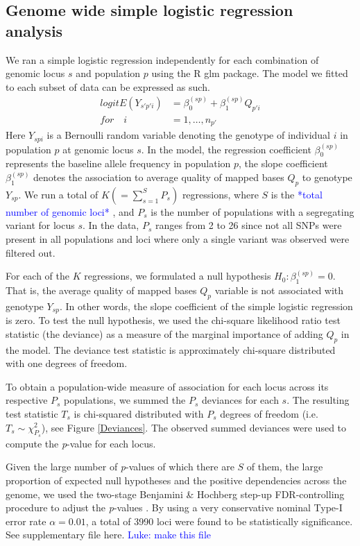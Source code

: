 \documentclass[9pt,lineno]{elife}
\newcommand{\luke}[1]{\textcolor{blue}{Luke: #1}}
\newcommand{\todo}[1]{\textcolor{blue}{*#1*}}
\begin{document}
\subsection{Genome wide simple logistic regression analysis}
We ran a simple logistic regression independently for each combination of genomic locus $s$ and population $p$ using the R glm package\citep{RDevelopmentCoreTeam2016}. The model we fitted to each subset of data can be expressed as such.
\begin{align*}
{logit}{E(Y_{s'p'i})} &= \beta_{0}^{(sp)} + \beta_{1}^{(sp)} Q_{p'i}
\\
\textit{for}\quad i &= 1,\hdots, n_{p'}
\end{align*}
Here $Y_{spi}$ is a Bernoulli random variable denoting the genotype of individual $i$ in population $p$ at genomic locus $s$. 
In the model, the regression coefficient $\beta_{0}^{(sp)}$ represents the baseline allele frequency in population $p$, the slope coefficient $\beta_{1}^{(sp)}$ denotes the association to average quality of mapped bases $Q_{p}$ to genotype $Y_{sp}$. 
We run a total of $K (= \sum_{s=1}^S P_s)$ regressions, where $S$ is the \todo{total number of genomic loci} , and $P_s$ is the number of populations with a segregating variant for locus $s$. In the data, $P_s$ ranges from 2 to 26 since not all SNPs were present in all populations and loci where only a single variant was observed were filtered out.

For each of the $K$ regressions, we formulated a null hypothesis $H_{0}: \beta_{1}^{(sp)}=0$. That is, the average quality of mapped bases $Q_{p}$ variable is not associated with genotype $Y_{sp}$.
In other words, the slope coefficient of the simple logistic regression is zero.
To test the null hypothesis, we used the chi-square likelihood ratio test statistic (the deviance) as a measure of the marginal importance of adding $Q_{p}$ in the model. 
The deviance test statistic is approximately chi-square distributed with one degrees of freedom.  

To obtain a population-wide measure of association for each locus across its respective $P_s$ populations, we summed the $P_s$ deviances for each $s$. The resulting test statistic $T_s$ is chi-squared distributed with $P_s$ degrees of freedom (i.e. $T_s \sim \chi^2_{P_s}$), see Figure \ref{Deviances}.
The observed summed deviances were used to compute the \textit{p}-value for each locus.


Given the large number of \textit{p}-values of which there are $S$ of them, the large proportion of expected null hypotheses and the positive dependencies across the genome, we used the two-stage Benjamini \& Hochberg step-up FDR-controlling procedure to adjust the \textit{p}-values
\citep{Benjamini2006}.
By using a very conservative nominal Type-I error rate $\alpha = 0.01$, a total of 3990 loci were found to be statistically significance. See supplementary file {here}. \luke{make this file}
\end{document}
